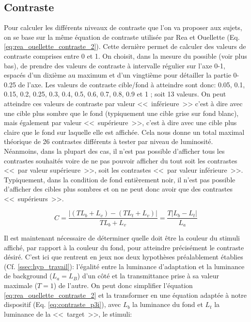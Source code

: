	\subsection{Contraste}
	\label{ssec:contraste}
	\par Pour calculer les différents niveaux de contraste que l'on va proposer aux sujets, on se base sur la même équation de contraste utilisée par Rea et Ouellette (Eq. \ref{eq:rea_ouellette_contraste_2}). Cette dernière permet de calculer des valeurs de contraste comprises entre 0 et 1. On choisit, dans la mesure du possible (voir plus bas), de prendre des valeurs de contraste à intervalle régulier sur l'axe 0-1, espacés d'un dixième au maximum et d'un vingtième pour détailler la partie 0-0.25 de l'axe. Les valeurs de contraste cible/fond à atteindre sont donc: 0.05, 0.1, 0.15, 0.2, 0.25, 0.3, 0.4, 0.5, 0.6, 0.7, 0.8, 0.9 et 1 ; soit 13 valeurs. On peut atteindre ces valeurs de contraste par valeur <<~inférieure~>> c'est à dire avec une cible plus sombre que le fond (typiquement une cible grise sur fond blanc), mais également par valeur <<~supérieure~>>, c'est à dire avec une cible plus claire que le fond sur laquelle elle est affichée. Cela nous donne un total maximal théorique de 26 contrastes différents à tester par niveau de luminosité. Néanmoins, dans la plupart des cas, il n'est pas possible d'afficher tous les contrastes souhaités voire de ne pas pouvoir afficher du tout soit les contrastes <<~par valeur supérieure~>>, soit les contrastes <<~par valeur inférieure~>>. Typiquement, dans la condition de fond entièrement noir, il n'est pas possible d'afficher des cibles plus sombres et on ne peut donc avoir que des contrastes <<~supérieurs~>>.
	
	\begin{equation}
		C = \frac{\vert (T L_b + L_v) - (T L_t + L_v) \vert}{T L_b + L_v} = \frac{T \vert L_b - L_t \vert}{L_a}
		\label{eq:rea_ouellette_contraste_2}
	\end{equation}
	
	\par Il est maintenant nécessaire de déterminer quelle doit être la couleur du stimuli affiché, par rapport à la couleur du fond, pour atteindre précisément le contraste désiré. C'est ici que rentrent en jeux nos deux hypothèses préalablement établies (Cf. \ref{ssec:hyp_travail}): l'égalité entre la luminance d'adaptation et la luminance de background ($L_a = L_B$) d'un côté et la transmittance prise à sa valeur maximale ($T = 1$) de l'autre. On peut donc simplifier l'équation \ref{eq:rea_ouellette_contraste_2} et la transformer en une équation adaptée à notre dispositif (Eq. \ref{eq:contraste_p3i}), avec $L_b$ la luminance du fond et $L_t$ la luminance de la <<~target~>>, le stimuli:
	
